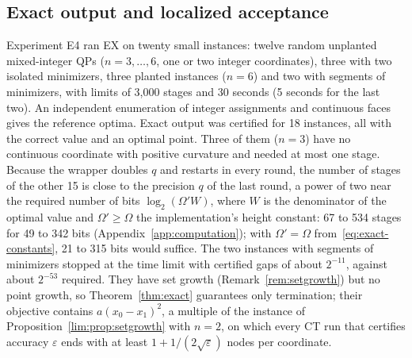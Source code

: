 \subsection{Exact output and localized acceptance}\label{sec:comp-exact}
Experiment E4 ran EX on twenty small instances: twelve random unplanted
mixed-integer QPs ($n=3,\dots,6$, one or two integer coordinates), three with
two isolated minimizers, three planted instances ($n=6$) and two with segments
of minimizers, with limits of 3{,}000 stages and 30 seconds (5 seconds for the
last two). An independent enumeration of integer assignments and continuous
faces gives the reference optima. Exact output was certified for 18
instances, all with the correct value and an optimal point. Three of them
($n=3$) have no continuous coordinate with positive curvature and needed at
most one stage. Because the wrapper doubles $q$ and restarts in every round,
the number of stages of the other 15 is close to the precision $q$ of the
last round, a power of two near the required number of bits
$\log_2(\Omega'W)$, where $W$ is the denominator of the optimal value and
$\Omega'\ge\Omega$ the implementation's height constant: 67 to 534 stages for
49 to 342 bits (Appendix~\ref{app:computation}); with $\Omega'=\Omega$
from~\eqref{eq:exact-constants}, 21 to 315 bits would suffice. The two instances with
segments of minimizers stopped at the time limit with certified gaps of about
$2^{-11}$, against about $2^{-53}$ required. They have set growth
(Remark~\ref{rem:setgrowth}) but no point growth, so Theorem~\ref{thm:exact}
guarantees only termination; their objective contains $a(x_0-x_1)^2$, a
multiple of the instance of Proposition~\ref{lim:prop:setgrowth} with $n=2$,
on which every CT run that certifies accuracy $\varepsilon$ ends with at least
$1+1/(2\sqrt\varepsilon)$ nodes per coordinate.

